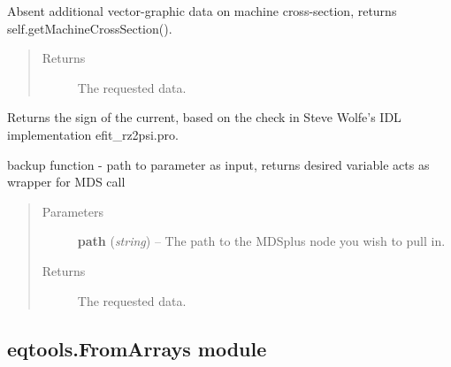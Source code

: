\documentclass[letterpaper,10pt,english]{sphinxmanual}
\begin{document}
\begin{fulllineitems}
\begin{fulllineitems}
Absent additional vector-graphic data on machine cross-section, returns
self.getMachineCrossSection().
\begin{quote}\begin{description}
\item[{Returns}] \leavevmode
The requested data.

\end{description}\end{quote}

\end{fulllineitems}


\begin{fulllineitems}
\label{eqtools:eqtools.EFIT.EFITTree.getCurrentSign}
Returns the sign of the current, based on the check in Steve Wolfe's IDL implementation efit\_rz2psi.pro.

\end{fulllineitems}


\begin{fulllineitems}
\label{eqtools:eqtools.EFIT.EFITTree.getParam}
backup function - path to parameter as input, returns desired variable acts as wrapper for MDS call
\begin{quote}\begin{description}
\item[{Parameters}] \leavevmode
\textbf{path} (\emph{string}) --
The path to the MDSplus node you wish to pull in.

\item[{Returns}] \leavevmode
The requested data.

\end{description}\end{quote}

\end{fulllineitems}


\end{fulllineitems}



\subsection{eqtools.FromArrays module}
\label{eqtools:module-eqtools.FromArrays}\label{eqtools:eqtools-fromarrays-module}
\end{document}
